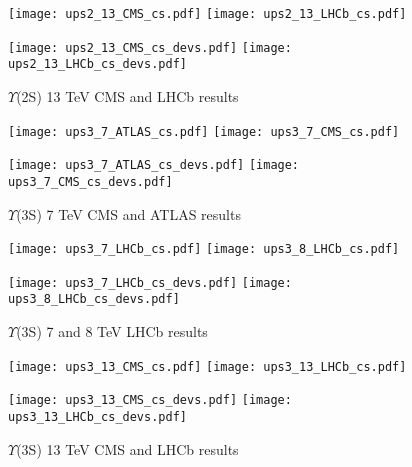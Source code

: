 \documentclass{article}
\begin{document}
\clearpage

\begin{figure}
\centering
\texttt{[image: ups2\_13\_CMS\_cs.pdf]}
\texttt{[image: ups2\_13\_LHCb\_cs.pdf]}

\texttt{[image: ups2\_13\_CMS\_cs\_devs.pdf]}
\texttt{[image: ups2\_13\_LHCb\_cs\_devs.pdf]}
\caption{$\Upsilon$(2S) 13 TeV CMS and LHCb results}
\end{figure}

\clearpage

\begin{figure}
\centering
\texttt{[image: ups3\_7\_ATLAS\_cs.pdf]}
\texttt{[image: ups3\_7\_CMS\_cs.pdf]}

\texttt{[image: ups3\_7\_ATLAS\_cs\_devs.pdf]}
\texttt{[image: ups3\_7\_CMS\_cs\_devs.pdf]}
\caption{$\Upsilon$(3S) 7 TeV CMS and ATLAS results}
\end{figure}

\clearpage

\begin{figure}
\centering
\texttt{[image: ups3\_7\_LHCb\_cs.pdf]}
\texttt{[image: ups3\_8\_LHCb\_cs.pdf]}

\texttt{[image: ups3\_7\_LHCb\_cs\_devs.pdf]}
\texttt{[image: ups3\_8\_LHCb\_cs\_devs.pdf]}
\caption{$\Upsilon$(3S) 7 and 8 TeV LHCb results}
\end{figure}

\clearpage

\begin{figure}
\centering
\texttt{[image: ups3\_13\_CMS\_cs.pdf]}
\texttt{[image: ups3\_13\_LHCb\_cs.pdf]}

\texttt{[image: ups3\_13\_CMS\_cs\_devs.pdf]}
\texttt{[image: ups3\_13\_LHCb\_cs\_devs.pdf]}
\caption{$\Upsilon$(3S) 13 TeV CMS and LHCb results}
\end{figure}


\clearpage
\restoregeometry



\pagebreak


\end{document}
